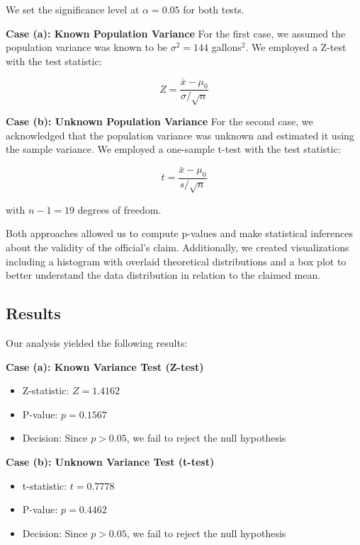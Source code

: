 \documentclass[12pt]{article}
\begin{document}
We set the significance level at $\alpha = 0.05$ for both tests.

\textbf{Case (a): Known Population Variance}
For the first case, we assumed the population variance was known to be $\sigma^2 = 144$ gallons$^2$. We employed a Z-test with the test statistic:

\begin{equation}
Z = \frac{\bar{x} - \mu_0}{\sigma/\sqrt{n}}
\end{equation}

\textbf{Case (b): Unknown Population Variance}
For the second case, we acknowledged that the population variance was unknown and estimated it using the sample variance. We employed a one-sample t-test with the test statistic:

\begin{equation}
t = \frac{\bar{x} - \mu_0}{s/\sqrt{n}}
\end{equation}

\noindent with $n-1 = 19$ degrees of freedom.

Both approaches allowed us to compute p-values and make statistical inferences about the validity of the official's claim. Additionally, we created visualizations including a histogram with overlaid theoretical distributions and a box plot to better understand the data distribution in relation to the claimed mean.

\subsection{Results}
Our analysis yielded the following results:

\textbf{Case (a): Known Variance Test (Z-test)}
\begin{itemize}
    \item Z-statistic: $Z = 1.4162$
    \item P-value: $p = 0.1567$
    \item Decision: Since $p > 0.05$, we fail to reject the null hypothesis
\end{itemize}

\textbf{Case (b): Unknown Variance Test (t-test)}
\begin{itemize}
    \item t-statistic: $t = 0.7778$
    \item P-value: $p = 0.4462$
    \item Decision: Since $p > 0.05$, we fail to reject the null hypothesis
\end{itemize}
\end{document}
